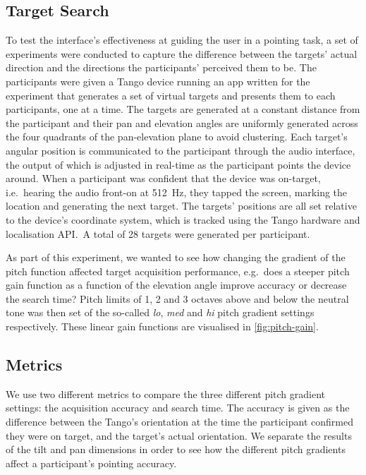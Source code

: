 \documentclass[]{interact}
\begin{document}
\subsection{Target Search}

To test the interface's effectiveness at guiding the user in a pointing task, a set of experiments were conducted to capture the difference between the targets' actual direction and the directions the participants' perceived them to be.
The participants were given a Tango device running an app written for the experiment that generates a set of virtual targets and presents them to each participants, one at a time. 
The targets are generated at a constant distance from the participant and their pan and elevation angles are uniformly generated across the four quadrants of the pan-elevation plane to avoid clustering.
Each target's angular position is communicated to the participant through the audio interface, the output of which is adjusted in real-time as the participant points the device around. 
When a participant was confident that the device was on-target, i.e.~hearing the audio front-on at \SI{512}{\hertz}, they tapped the screen, marking the location and generating the next target.
The targets' positions are all set relative to the device's coordinate system, which is tracked using the Tango hardware and localisation API.\
A total of 28 targets were generated per participant. 

As part of this experiment, we wanted to see how changing the gradient of the pitch function affected target acquisition performance, e.g.\ does a steeper pitch gain function as a function of the elevation angle improve accuracy or decrease the search time?
Pitch limits of 1, 2 and 3 octaves above and below the neutral tone was then set of the so-called \textit{lo}, \textit{med} and \textit{hi} pitch gradient settings respectively.
These linear gain functions are visualised in \cref{fig:pitch-gain}.

\subsection{Metrics}

We use two different metrics to compare the three different pitch gradient settings: the acquisition accuracy and search time.
The accuracy is given as the difference between the Tango's orientation at the time the participant confirmed they were on target, and the target's actual orientation.
We separate the results of the tilt and pan dimensions in order to see how the different pitch gradients affect a participant's pointing accuracy. 
\end{document}
